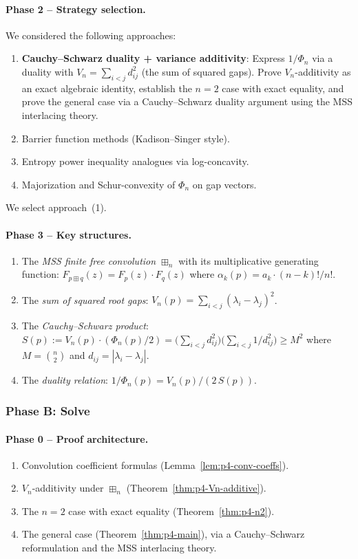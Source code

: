 \paragraph{Phase 2 -- Strategy selection.}
We considered the following approaches:
\begin{enumerate}
\item \textbf{Cauchy--Schwarz duality + variance additivity}: Express
  $1/\Phi_n$ via a duality with $V_n = \sum_{i<j} d_{ij}^2$ (the sum
  of squared gaps). Prove $V_n$-additivity as an exact algebraic identity,
  establish the $n = 2$ case with exact equality, and prove the general
  case via a Cauchy--Schwarz duality argument using the MSS interlacing theory.
\item Barrier function methods (Kadison--Singer style).
\item Entropy power inequality analogues via log-concavity.
\item Majorization and Schur-convexity of $\Phi_n$ on gap vectors.
\end{enumerate}
We select approach~(1).

\paragraph{Phase 3 -- Key structures.}
\begin{enumerate}
\item The \emph{MSS finite free convolution} $\boxplus_n$ \cite{MSS22}
  with its multiplicative generating function: $F_{p \boxplus q}(z)
  = F_p(z) \cdot F_q(z)$ where $\alpha_k(p) = a_k \cdot (n{-}k)!/n!$.
\item The \emph{sum of squared root gaps}:
  $V_n(p) = \sum_{i<j} (\lambda_i - \lambda_j)^2$.
\item The \emph{Cauchy--Schwarz product}:
  $S(p) := V_n(p) \cdot (\Phi_n(p)/2)
  = \bigl(\sum_{i<j} d_{ij}^2\bigr)
  \bigl(\sum_{i<j} 1/d_{ij}^2\bigr) \geq M^2$
  where $M = \binom{n}{2}$ and $d_{ij} = |\lambda_i - \lambda_j|$.
\item The \emph{duality relation}: $1/\Phi_n(p) = V_n(p) / (2\, S(p))$.
\end{enumerate}

\bigskip
\subsubsection*{Phase B: Solve}

\paragraph{Phase 0 -- Proof architecture.}
\begin{enumerate}
\item[(I)] Convolution coefficient formulas (Lemma~\ref{lem:p4-conv-coeffs}).
\item[(II)] $V_n$-additivity under $\boxplus_n$ (Theorem~\ref{thm:p4-Vn-additive}).
\item[(III)] The $n = 2$ case with exact equality (Theorem~\ref{thm:p4-n2}).
\item[(IV)] The general case (Theorem~\ref{thm:p4-main}), via a
  Cauchy--Schwarz reformulation and the MSS interlacing theory.
\end{enumerate}

